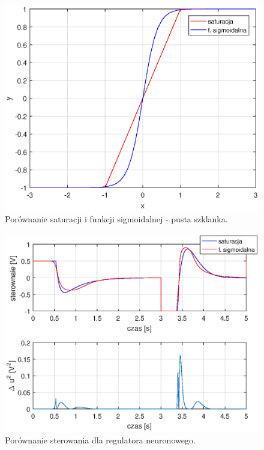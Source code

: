 \begin{figure}[h!]
	\centering
	\includegraphics[scale = 0.8]{fig/por_sat_2.eps}
	\caption		
	{Porównanie saturacji i funkcji sigmoidalnej - pusta szklanka.}
	\label{por_sat2}
\end{figure} 

\begin{figure}[h!]
	\centering
	\includegraphics[scale = 1]{fig/por_ster_n.eps}
	\caption		
	{Porównanie sterowania dla regulatora neuronowego.}
	\label{neuron_ster_por}
\end{figure}
\FloatBarrier
